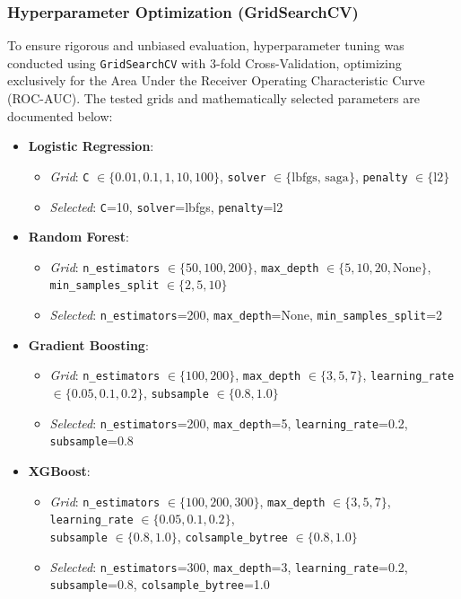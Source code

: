 \documentclass[11pt,a4paper]{article}
\begin{document}
\subsubsection{Hyperparameter Optimization (GridSearchCV)}
To ensure rigorous and unbiased evaluation, hyperparameter tuning was conducted using \texttt{GridSearchCV} with 3-fold Cross-Validation, optimizing exclusively for the Area Under the Receiver Operating Characteristic Curve (ROC-AUC). The tested grids and mathematically selected parameters are documented below:

\begin{itemize}
    \item \textbf{Logistic Regression}:
    \begin{itemize}
        \item \textit{Grid}: \texttt{C} $\in \{0.01, 0.1, 1, 10, 100\}$, \texttt{solver} $\in \{\text{lbfgs, saga}\}$, \texttt{penalty} $\in \{\text{l2}\}$
        \item \textit{Selected}: \texttt{C}=10, \texttt{solver}=lbfgs, \texttt{penalty}=l2
    \end{itemize}

    \item \textbf{Random Forest}:
    \begin{itemize}
        \item \textit{Grid}: \texttt{n\_estimators} $\in \{50, 100, 200\}$, \texttt{max\_depth} $\in \{5, 10, 20, \text{None}\}$, \texttt{min\_samples\_split} $\in \{2, 5, 10\}$
        \item \textit{Selected}: \texttt{n\_estimators}=200, \texttt{max\_depth}=None, \texttt{min\_samples\_split}=2
    \end{itemize}

    \item \textbf{Gradient Boosting}:
    \begin{itemize}
        \item \textit{Grid}: \texttt{n\_estimators} $\in \{100, 200\}$, \texttt{max\_depth} $\in \{3, 5, 7\}$, \texttt{learning\_rate} $\in \{0.05, 0.1, 0.2\}$, \texttt{subsample} $\in \{0.8, 1.0\}$
        \item \textit{Selected}: \texttt{n\_estimators}=200, \texttt{max\_depth}=5, \texttt{learning\_rate}=0.2, \texttt{subsample}=0.8
    \end{itemize}

    \item \textbf{XGBoost}:
    \begin{itemize}
        \item \textit{Grid}: \texttt{n\_estimators} $\in \{100, 200, 300\}$, \texttt{max\_depth} $\in \{3, 5, 7\}$, \texttt{learning\_rate} $\in \{0.05, 0.1, 0.2\}$,\\
        \texttt{subsample} $\in \{0.8, 1.0\}$, \texttt{colsample\_bytree} $\in \{0.8, 1.0\}$
        \item \textit{Selected}: \texttt{n\_estimators}=300, \texttt{max\_depth}=3, \texttt{learning\_rate}=0.2,\\
        \texttt{subsample}=0.8, \texttt{colsample\_bytree}=1.0
    \end{itemize}
\end{itemize}
\end{document}
